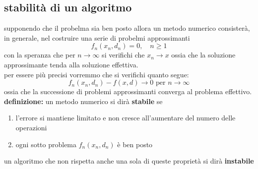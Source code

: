 \documentclass{article}
\begin{document}
\subsection{stabilità di un algoritmo} 
supponendo che il probelma sia ben posto allora un metodo numerico consisterà, in generale, nel costruire una serie di probelmi approssimanti 
\begin{equation}
  f_n(x_n,d_n)=0,\quad n\geq1 
\end{equation} 
con la speranza che per $n \to \infty$ si verifichi che $x_n \to x$ ossia che la soluzione approssimante tenda alla soluzione effettiva.\\ 
per essere più precisi vorremmo che si verifichi quanto segue:
\begin{equation}
  f_n(x_n,d_n)-f(x,d)\to0 \text{ per }n\to\infty 
\end{equation}
ossia che la successione di problemi approssimanti converga al problema effettivo.\newpage
\textbf{definizione:} un metodo numerico si dirà \textbf{stabile} se 
\begin{enumerate}
  \item l'errore si mantiene limitato e non cresce all'aumentare del numero delle operazioni \item ogni sotto problema $f_n(x_n,d_n)$ è ben posto
\end{enumerate}
un algoritmo che non rispetta anche una sola di queste proprietà si dirà \textbf{instabile}
\end{document}
